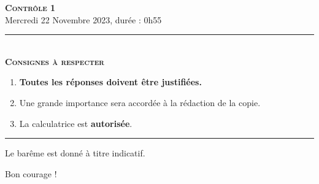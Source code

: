 \documentclass[11pt]{article}
\begin{document}
\begin{center}
\textbf{\LARGE \textsc{Contrôle 1}}\\[2mm]

{\large Mercredi 22 Novembre 2023, durée : 0h55}\\[1mm]
\noindent\rule{8cm}{0.4pt}\\[1mm]
\textbf{\textsc{Consignes à respecter}}
\begin{enumerate}[label=\textbf{\arabic*/}]
\item \textbf{Toutes les réponses doivent être justifiées.}
\item Une grande importance sera accordée à la rédaction de la
  copie.
\item La calculatrice est \textbf{autorisée}.
    \end{enumerate}
\noindent\rule{12cm}{0.4pt}
\end{center}
\noindent Le barême est donné à titre indicatif.
\vspace{2mm}
\begin{center}
  Bon courage !
\end{center}
\end{document}
